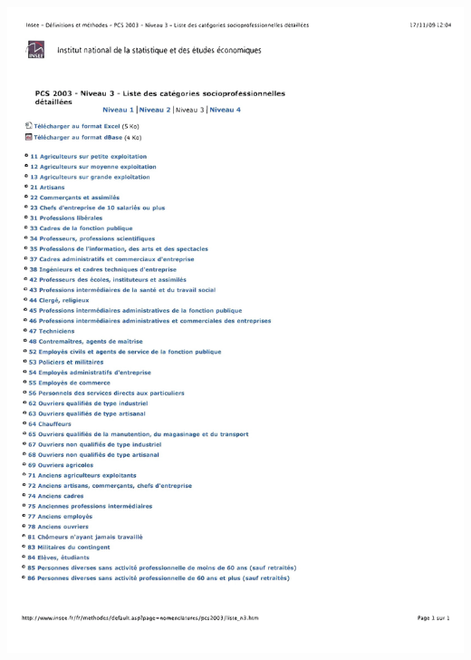 \documentclass{book}
\begin{document}
\includegraphics[scale=.3]{codesIPC_2.png}
\newpage
\end{document}
